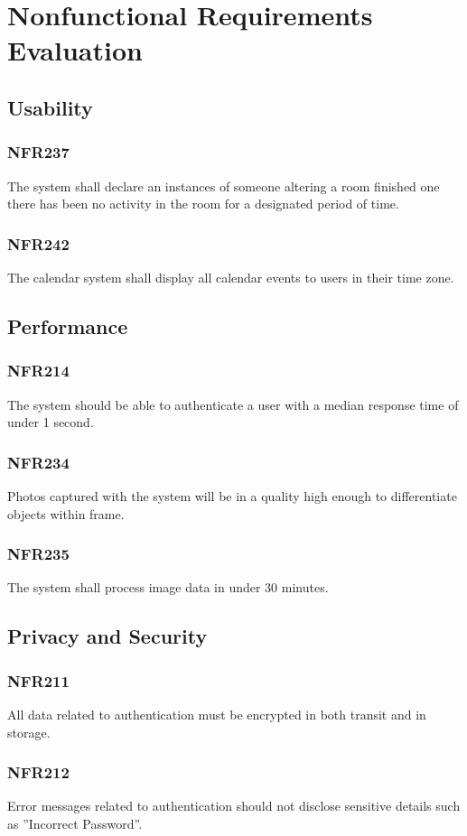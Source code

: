 \documentclass[12pt, titlepage]{article}
\begin{document}
\section{Nonfunctional Requirements Evaluation}
\subsection{Usability}
\subsubsection{NFR237}
The system shall declare an instances of someone altering a room
finished one there has been no activity in the room for a designated period
of time.
\subsubsection{NFR242}
The calendar system shall display all calendar events to users in
their time zone.

\subsection{Performance}
\subsubsection{NFR214}
The system should be able to authenticate a user with a median
response time of under 1 second.
\subsubsection{NFR234} Photos captured with the system will be in a quality high
enough to differentiate objects within frame.
\subsubsection{NFR235}
The system shall process image data in under 30 minutes.

\subsection{Privacy and Security}
\subsubsection{NFR211}
All data related to authentication must be encrypted in both
transit and in storage.
\subsubsection{NFR212}
Error messages related to authentication should not disclose
sensitive details such as ”Incorrect Password”.
\end{document}

